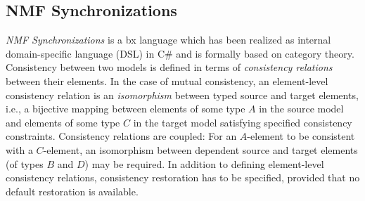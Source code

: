 
\subsection{NMF Synchronizations}
\label{sec:NMF}






\emph{NMF Synchronizations} \cite{SoSyM2017-Hinkel} is a bx language which has been realized as internal domain-specific language (DSL) in C\# and is formally based on category theory. Consistency between two models is defined in terms of \emph{consistency relations} between their elements. In the case of mutual consistency, an element-level consistency relation is an \emph{isomorphism} between typed source and target elements, i.e., a bijective mapping between elements of some type $A$ in the source model and elements of some type $C$ in the target model satisfying specified consistency constraints. Consistency relations are coupled: For an $A$-element to be consistent with a $C$-element, an isomorphism between dependent source and target elements (of types $B$ and $D$) may be required. In addition to defining element-level consistency relations, consistency restoration has to be specified, provided that no default restoration is available.

